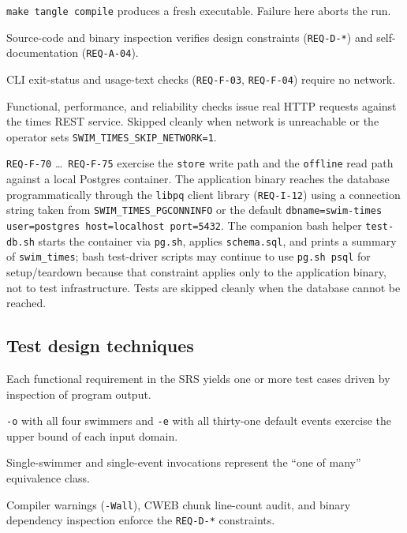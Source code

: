 \documentclass[12pt]{article}
\newcommand{\code}[1]{\texttt{#1}}
\newcommand{\req}[1]{\texttt{#1}}
\begin{document}
\begin{description}[style=nextline]
  \item[Build sub-process.]
        \code{make tangle compile} produces a fresh executable.
        Failure here aborts the run.
  \item[Static sub-process.]
        Source-code and binary inspection verifies design
        constraints (\req{REQ-D-*}) and self-documentation
        (\req{REQ-A-04}).
  \item[Offline behaviour sub-process.]
        CLI exit-status and usage-text checks (\req{REQ-F-03},
        \req{REQ-F-04}) require no network.
  \item[Online behaviour sub-process.]
        Functional, performance, and reliability checks issue real
        HTTP requests against the times REST service.  Skipped
        cleanly when network is unreachable or the operator sets
        \code{SWIM\_TIMES\_SKIP\_NETWORK=1}.
  \item[Database persistence sub-process.]
        \req{REQ-F-70} \dots\ \req{REQ-F-75} exercise the
        \code{store} write path and the \code{offline} read path
        against a local Postgres container.  The application
        binary reaches the database programmatically through the
        \texttt{libpq} client library (\req{REQ-I-12}) using a
        connection string taken from
        \texttt{SWIM\_TIMES\_PGCONNINFO} or the default
        \texttt{dbname=swim-times user=postgres host=localhost
        port=5432}.  The companion bash helper \code{test-db.sh}
        starts the container via \texttt{pg.sh}, applies
        \texttt{schema.sql}, and prints a summary of
        \texttt{swim\_times}; bash test-driver scripts may
        continue to use \texttt{pg.sh psql} for setup/teardown
        because that constraint applies only to the application
        binary, not to test infrastructure.  Tests are skipped
        cleanly when the database cannot be reached.
\end{description}

\subsection{Test design techniques}

\begin{description}[style=nextline]
  \item[Specification-based.]
        Each functional requirement in the SRS yields one or more
        test cases driven by inspection of program output.
  \item[Boundary value.]
        \code{-o} with all four swimmers and \code{-e} with all
        thirty-one default events exercise the upper bound of
        each input domain.
  \item[Equivalence partition.]
        Single-swimmer and single-event invocations represent the
        ``one of many'' equivalence class.
  \item[Static analysis.]
        Compiler warnings (\code{-Wall}), CWEB chunk line-count
        audit, and binary dependency inspection enforce the
        \req{REQ-D-*} constraints.
\end{description}
\end{document}
